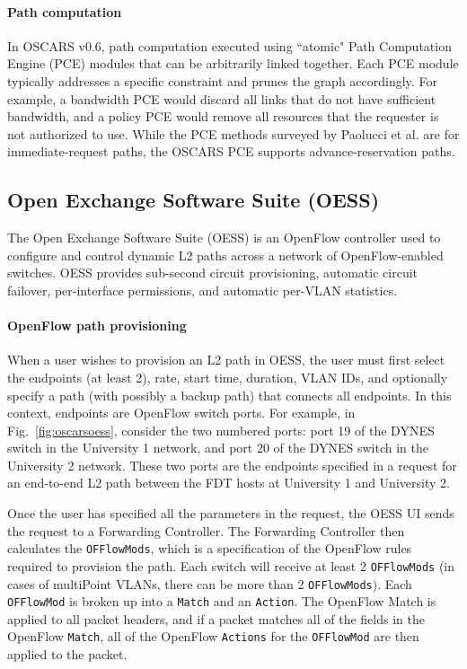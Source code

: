 \paragraph{Path computation} In OSCARS v0.6, path computation
executed using ``atomic" Path Computation Engine (PCE) modules that can be
arbitrarily linked together. Each PCE module typically addresses a
specific constraint and prunes the graph accordingly. For example, a bandwidth PCE would discard all links that do not
have sufficient bandwidth, and a policy PCE would remove
all resources that the requester is not authorized to use.
While the PCE methods surveyed by Paolucci et al. \cite{6422287} are
for immediate-request paths, the OSCARS PCE supports
advance-reservation paths.


\subsection{Open Exchange Software Suite (OESS)}
\label{sec:OESS}

The Open Exchange Software Suite (OESS) is an OpenFlow
controller used to configure and control dynamic L2 paths
across a network of OpenFlow-enabled switches. OESS provides sub-second circuit provisioning, automatic circuit failover, per-interface permissions, and automatic per-VLAN
statistics.

\paragraph{OpenFlow path provisioning}
When a user wishes to provision an L2 path in OESS, the user must first select the endpoints (at least 2), rate, start time, duration, VLAN IDs, and optionally specify a path (with possibly a backup path) that connects all endpoints. In this context, endpoints are OpenFlow switch ports. For example, in Fig.~\ref{fig:oscarsoess}, consider the two numbered ports: port 19 of the DYNES switch in the University 1 network, and port 20 of the DYNES switch in the University 2 network. These two ports are the endpoints specified in a request for an end-to-end L2 path between the FDT hosts at University 1 and University 2.

Once the user has specified all the parameters in the request, the OESS UI sends the request to a Forwarding Controller. The Forwarding
Controller then calculates the \texttt{OFFlowMods}, which is a specification of the OpenFlow rules required to provision the path.
Each switch will receive at least 2 \texttt{OFFlowMods} (in cases of
multiPoint VLANs, there can be more than 2 \texttt{OFFlowMods}).
Each \texttt{OFFlowMod} is broken up into a \texttt{Match} and an \texttt{Action}.
The OpenFlow Match is applied to all packet headers, and
if a packet matches all of the fields in the OpenFlow \texttt{Match},
all of the OpenFlow \texttt{Actions} for the \texttt{OFFlowMod} are then
applied to the packet.

